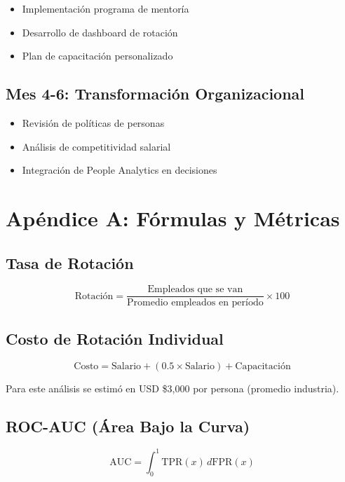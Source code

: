 \documentclass[11pt,a4paper,twoside]{article}
\begin{document}
\begin{itemize}
    \item Implementación programa de mentoría
    \item Desarrollo de dashboard de rotación
    \item Plan de capacitación personalizado
\end{itemize}

\subsection{Mes 4-6: Transformación Organizacional}

\begin{itemize}
    \item Revisión de políticas de personas
    \item Análisis de competitividad salarial
    \item Integración de People Analytics en decisiones
\end{itemize}

\newpage
\section*{Apéndice A: Fórmulas y Métricas}

\subsection*{Tasa de Rotación}
\[
\text{Rotación} = \frac{\text{Empleados que se van}}{\text{Promedio empleados en período}} \times 100
\]

\subsection*{Costo de Rotación Individual}
\[
\text{Costo} = \text{Salario} + (0.5 \times \text{Salario}) + \text{Capacitación}
\]

Para este análisis se estimó en USD \$3,000 por persona (promedio industria).

\subsection*{ROC-AUC (Área Bajo la Curva)}
\[
\text{AUC} = \int_{0}^{1} \text{TPR}(x) \, d\text{FPR}(x)
\]
\end{document}
